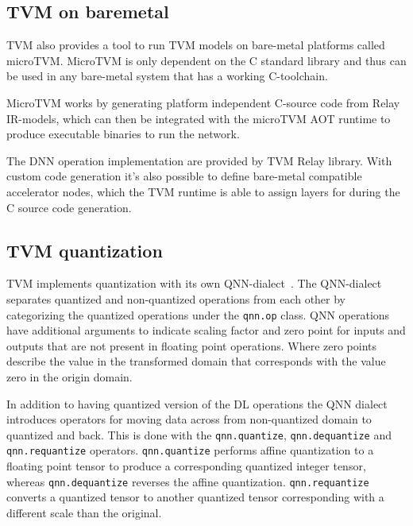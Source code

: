 \documentclass[12pt,a4paper,english
]{tunithesis}
\begin{document}
\subsection{TVM on baremetal}
TVM also provides a tool to run TVM models on bare-metal platforms called microTVM. MicroTVM is only dependent on the C standard library and thus can be used in any bare-metal system that has a working C-toolchain.

MicroTVM works by generating platform independent C-source code from Relay IR-models, which can then be integrated with the microTVM AOT runtime to produce executable binaries to run the network.

The DNN operation implementation are provided by TVM Relay library.
With custom code generation it's also possible to define bare-metal compatible accelerator nodes, which the TVM runtime is able to assign layers for during the C source code generation.~\parencite{TVM}

\subsection{TVM quantization}
TVM implements quantization with its own QNN-dialect~\cite{jain_efficient_2020}. The QNN-dialect separates quantized and non-quantized operations from each other by categorizing the quantized operations under the \texttt{qnn.op} class. QNN operations have additional arguments to indicate scaling factor and zero point for inputs and outputs that are not present in floating point operations.
Where zero points describe the value in the transformed domain that corresponds with the value zero in the origin domain.

In addition to having quantized version of the DL operations the QNN dialect introduces operators for moving data across from non-quantized domain to quantized and back. This is done with the \texttt{qnn.quantize}, \texttt{qnn.dequantize} and \texttt{qnn.requantize} operators. \texttt{qnn.quantize} performs affine quantization to a floating point tensor to produce a corresponding quantized integer tensor, whereas \texttt{qnn.dequantize} reverses the affine quantization. \texttt{qnn.requantize} converts a quantized tensor to another quantized tensor corresponding with a different scale than the original.
\end{document}
